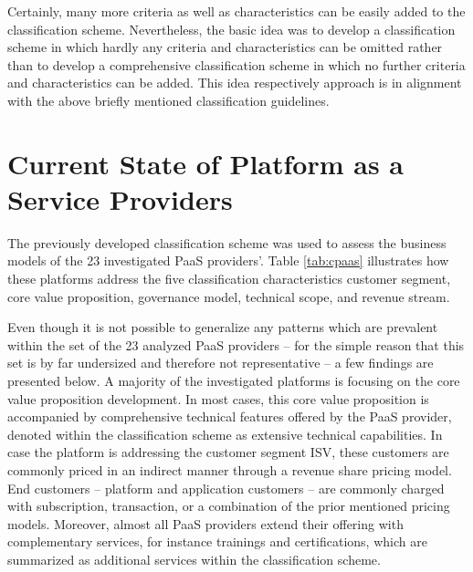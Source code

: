 Certainly, many more criteria as well as characteristics can be easily added to the classification scheme. Nevertheless, the basic idea was to develop a classification scheme in which hardly any criteria and characteristics can be omitted rather than to develop a comprehensive classification scheme in which no further criteria and characteristics can be added. This idea respectively approach is in alignment with the above briefly mentioned classification guidelines.

\section{Current State of Platform as a Service Providers}\label{ch:sota:cPaaS}

The previously developed classification scheme was used to assess the business models of the 23 investigated \ac{PaaS} providers'. Table \ref{tab:cpaas} illustrates how these platforms address the five classification characteristics customer segment, core value proposition, governance model, technical scope, and revenue stream. 

Even though it is not possible to generalize any patterns which are prevalent within the set of the 23 analyzed \ac{PaaS} providers -- for the simple reason that this set is by far undersized and therefore not representative -- a few findings are presented below. A majority of the investigated platforms is focusing on the core value proposition development. In most cases, this core value proposition is accompanied by comprehensive technical features offered by the \ac{PaaS} provider, denoted within the classification scheme as extensive technical capabilities. In case the platform is addressing the customer segment \ac{ISV}, these customers are commonly priced in an indirect manner through a revenue share pricing model. End customers -- platform and application customers -- are commonly charged with subscription, transaction, or a combination of the prior mentioned pricing models. Moreover, almost all \ac{PaaS} providers extend their offering with complementary services, for instance trainings and certifications, which are summarized as additional services within the classification scheme.

